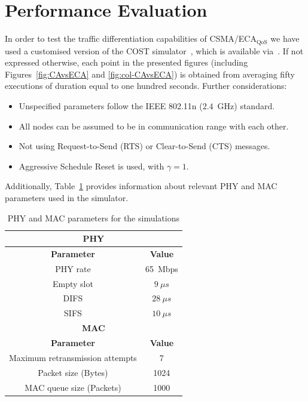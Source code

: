 \section{Performance Evaluation}\label{section4}
In order to test the traffic differentiation capabilities of CSMA/ECA$_{\text{QoS}}$ we have used a customised version of the COST simulator~\cite{COST}, which is available via~\cite{CSMA-ECA-HEW}. If not expressed otherwise, each point in the presented figures (including Figures~\ref{fig:CAvsECA} and \ref{fig:col-CAvsECA}) is obtained from averaging fifty executions of duration equal to one hundred seconds. Further considerations:
	\begin{itemize}
		\item Unspecified parameters follow the IEEE 802.11n ($2.4$~GHz) standard.
		\item All nodes can be assumed to be in communication range with each other.
		\item Not using Request-to-Send (RTS) or Clear-to-Send (CTS) messages.%
		\item Aggressive Schedule Reset is used, with $\gamma=1$.
	\end{itemize}

Additionally, Table~\ref{tab:mac-params} provides information about relevant PHY and MAC parameters used in the simulator.
	\begin{table}
		\centering
		\caption{PHY and MAC parameters for the simulations}
		\label{tab:mac-params}
		\begin{tabular}{|c|c|}
			\hline
			\multicolumn{2}{|c|}{{\bfseries PHY}}\\
			\hline
			{\bfseries Parameter} & {\bfseries Value}\\
			\hline
			PHY rate & 65~Mbps\\
			Empty slot & $9~\mu s$\\
			DIFS & $28~\mu s$\\
			SIFS & $10~\mu s$\\
			\hline
			\multicolumn{2}{|c|}{{\bfseries MAC}}\\
			\hline
			{\bfseries Parameter} & {\bfseries Value}\\
			\hline
			Maximum retransmission attempts & 7\\
			Packet size (Bytes) & 1024\\
			MAC queue size (Packets) & 1000\\
			\hline
		\end{tabular}
	\end{table}
	
